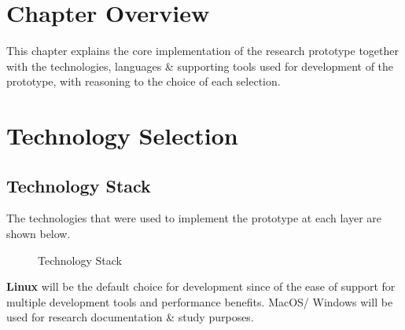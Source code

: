 \section{Chapter Overview}
This chapter explains the core implementation of the research prototype together with the technologies, languages \& supporting tools used for development of the prototype, with reasoning to the choice of each selection.

\section{Technology Selection}

\subsection{Technology Stack}
The technologies that were used to implement the prototype at each layer are shown below.


\begin{figure}[h!]
\centering
{}
\caption{Technology Stack}
\label{fig:teck-stack}
\end{figure}


\textbf{Linux} will be the default choice for development since of the ease of support for multiple development tools and performance benefits. MacOS/ Windows will be used for research documentation \& study purposes.

